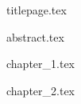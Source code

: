 \documentclass[12pt, a4paper]{article}
\begin{document}
{titlepage.tex}
\newpage

{abstract.tex}
\newpage

\tableofcontents{}
\newpage

\listoffigures
\newpage

\listoftables
{}

{chapter_1.tex}
\newpage

{chapter_2.tex}
\newpage

\printbibliography
\end{document}

